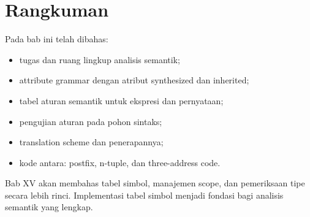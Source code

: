 \section*{Rangkuman}

Pada bab ini telah dibahas:
\begin{itemize}[leftmargin=*]
  \item tugas dan ruang lingkup analisis semantik;
  \item attribute grammar dengan atribut synthesized dan inherited;
  \item tabel aturan semantik untuk ekspresi dan pernyataan;
  \item pengujian aturan pada pohon sintaks;
  \item translation scheme dan penerapannya;
  \item kode antara: postfix, n-tuple, dan three-address code.
\end{itemize}

Bab XV akan membahas tabel simbol, manajemen scope, dan pemeriksaan
tipe secara lebih rinci. Implementasi tabel simbol menjadi fondasi
bagi analisis semantik yang lengkap.
